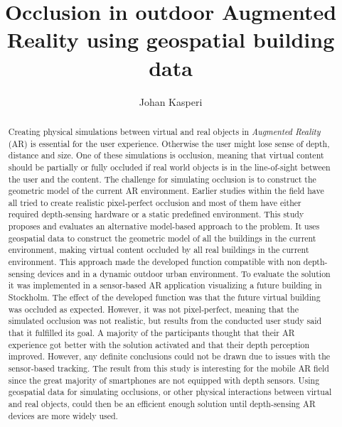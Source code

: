 \documentclass[siggraph]{acmart}
\begin{document}
\title{Occlusion in outdoor Augmented Reality using geospatial building data}

\author{Johan Kasperi}

\begin{abstract}
Creating physical simulations between virtual and real objects in \textit{Augmented Reality} (AR) is essential for the user experience. Otherwise the user might lose sense of depth, distance and size. One of these simulations is occlusion, meaning that virtual content should be partially or fully occluded if real world objects is in the line-of-sight between the user and the content. The challenge for simulating occlusion is to construct the geometric model of the current AR environment. Earlier studies within the field have all tried to create realistic pixel-perfect occlusion and most of them have either required depth-sensing hardware or a static predefined environment. This study proposes and evaluates an alternative model-based approach to the problem. It uses geospatial data to construct the geometric model of all the buildings in the current environment, making virtual content occluded by all real buildings in the current environment. This approach made the developed function compatible with non depth-sensing devices and in a dynamic outdoor urban environment. To evaluate the solution it was implemented in a sensor-based AR application visualizing a future building in Stockholm. The effect of the developed function was that the future virtual building was occluded as expected. However, it was not pixel-perfect, meaning that the simulated occlusion was not realistic, but results from the conducted user study said that it fulfilled its goal. A majority of the participants thought that their AR experience got better with the solution activated and that their depth perception improved. However, any definite conclusions could not be drawn due to issues with the sensor-based tracking. The result from this study is interesting for the mobile AR field since the great majority of smartphones are not equipped with depth sensors. Using geospatial data for simulating occlusions, or other physical interactions between virtual and real objects, could then be an efficient enough solution until depth-sensing AR devices are more widely used.
\end{abstract}


\maketitle





\end{document}
